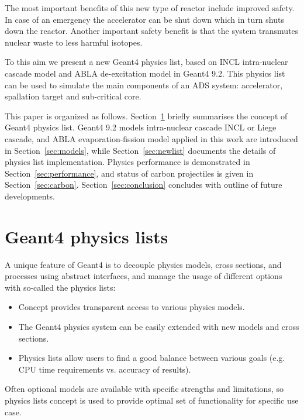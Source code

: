 \documentclass[a4paper]{jpconf}
\begin{document}
The most important benefits of
this new type of reactor include improved safety. In case of an
emergency the accelerator can be shut down which in turn shuts down
the reactor. Another important safety benefit is that the system
transmutes nuclear waste to less harmful isotopes.

To this aim we present a new Geant4 physics list, 
based on INCL \cite{incl} intra-nuclear cascade model and ABLA de-excitation model \cite{abla, abla1, abla2} in Geant4 9.2. 
This physics list can be used to simulate the main components of an ADS system: accelerator, spallation
target and sub-critical core.

This paper is organized as follows.
Section~\ref{sec:list} briefly summarises the concept of Geant4 physics list.
Geant4 9.2 models intra-nuclear cascade INCL or Liege cascade, and ABLA evaporation-fission model
applied in this work are introduced in Section~\ref{sec:models}, 
while Section~\ref{sec:newlist} documents the details of physics list implementation.
Physics performance is demonstrated in Section~\ref{sec:performance},
and status of carbon projectiles is given in Section~\ref{sec:carbon}. 
Section~\ref{sec:conclusion} concludes with outline of future developments.

\section{Geant4 physics lists}\label{sec:list}

A unique feature of Geant4 is to decouple physics models, cross sections, and processes
using abstract interfaces, and manage the usage of different options with so-called the physics lists:
\begin{itemize}
\item Concept provides transparent access to various physics models.
\item The Geant4 physics system can be easily extended with new models and cross sections.
\item Physics lists allow users to find a good balance between various goals 
(e.g. CPU time requirements vs. accuracy of results).
\end{itemize}

Often optional models are available with specific strengths and limitations, 
so physics lists concept is used to provide optimal set of functionality for specific use case.
\end{document}
